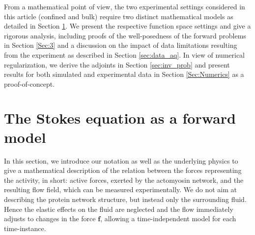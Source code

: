 \documentclass[final,leqno]{scrarticle}
\begin{document}

From a mathematical point of view, the two experimental settings considered in this article (confined and bulk) require two distinct mathematical models as detailed in Section \ref{Sec:2}. We present the respective function space settings and give a rigorous analysis, including proofs of the well-posedness of the forward problems in Section \ref{Sec:3} and a discussion on the impact of data limitations resulting from the experiment as described in Section \ref{sec:data_aq}. In view of numerical regularization, we derive the adjoints in Section \ref{sec:inv_prob} and present results for both simulated and experimental data in Section \ref{Sec:Numerics} as a proof-of-concept.

\section{The Stokes equation as a forward model} \label{Sec:2}
In this section, we introduce our notation as well as the underlying physics to give a mathematical description of the relation between the forces representing the activity, in short: active forces, exerted by the actomyosin network, and the resulting flow field, which can be measured experimentally.
We do not aim at describing the protein network structure, but instead only the surrounding fluid. Hence the elastic effects on the fluid are neglected and the flow immediately adjusts to changes in the force $\mathbf{f}$, allowing a time-independent model for each time-instance.
\end{document}
